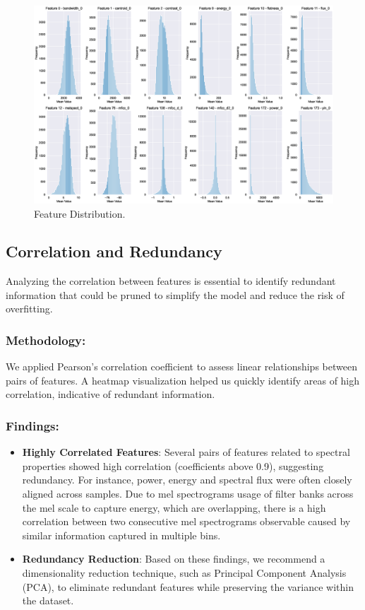 \begin{figure}[!ht]
	\centering
	\includegraphics[scale=0.3]{fig/feature_dist}
	\vspace{-0.3cm}
	\caption{Feature Distribution.}
	\label{fig:FeatureDistribution}
	\vspace{-0.1cm}
\end{figure}


\subsection{Correlation and Redundancy}

Analyzing the correlation between features is essential to identify redundant information that could be pruned to simplify the model and reduce the risk of overfitting.

\subsubsection{Methodology:}

We applied Pearson's correlation coefficient to assess linear relationships between pairs of features. A heatmap visualization helped us quickly identify areas of high correlation, indicative of redundant information.

\subsubsection{Findings:}

\begin{itemize}
    \item \textbf{Highly Correlated Features}: Several pairs of features related to spectral properties showed high correlation (coefficients above 0.9), suggesting redundancy. For instance, power, energy and spectral flux were often closely aligned across samples.
    Due to mel spectrograms usage of filter banks across the mel scale to capture energy, which are overlapping, there is a high correlation between two consecutive mel spectrograms observable caused by similar information captured in multiple bins.
    \item \textbf{Redundancy Reduction}: Based on these findings, we recommend a dimensionality reduction technique, such as Principal Component Analysis (PCA), to eliminate redundant features while preserving the variance within the dataset.
\end{itemize}

